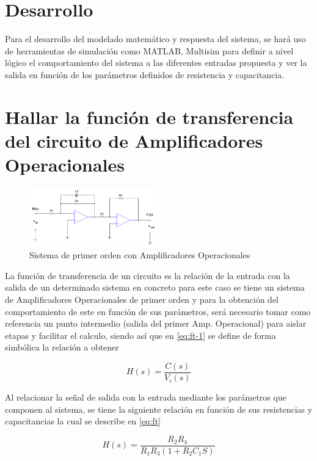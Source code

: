 \documentclass[conference]{IEEEtran}
\begin{document}
	\section{Desarrollo}
	Para el desarrollo del modelado matemático y respuesta del sistema, se hará uso de herramientas de simulación como MATLAB, Multisim para definir a nivel lógico el comportamiento del sistema a las diferentes entradas propuesta y ver la salida en función de los parámetros definidos de resistencia y capacitancia.
	
	
	\section{Hallar la función de transferencia del circuito de Amplificadores Operacionales}
	\begin{figure}
		\centering
		\includegraphics[width=0.5\textwidth]{media/circuito-inicial}
		\caption{Sistema de primer orden con Amplificadores Operacionales}
		\label{fig:circuito-inicial}
	\end{figure}
	
	
	La función de transferencia de un circuito es la relación de la entrada con la salida de un determinado sistema en concreto para este caso se tiene un sistema de Amplificadores Operacionales de primer orden y para la obtención del comportamiento de este en función de sus parámetros, será necesario tomar como referencia un punto intermedio (salida del primer Amp. Operacional) para aislar etapas y facilitar el calculo, siendo así que en \ref{eq:ft-1} se define de forma simbólica la relación a obtener
	
	\begin{equation}
		H(s) = \frac{C(s)}{V_i(s)}
		\label{eq:ft-1}
	\end{equation}
	
	Al relacionar la señal de salida con la entrada mediante los parámetros que componen al sistema, se tiene la siguiente relación en función de sus resistencias y capacitancias la cual se describe en \ref{eq:ft}
	
	\begin{equation}
		H(s) = \frac{R_2 R_4}{R_1 R_3(1 + R_2 C_1 S)}
		\label{eq:ft}
	\end{equation}
	
\end{document}
